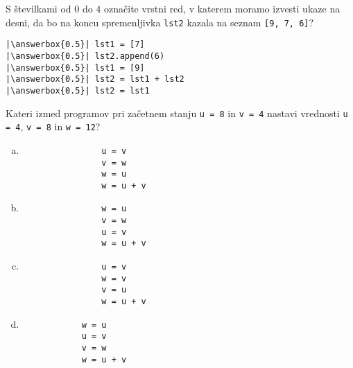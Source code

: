\documentclass[arhiv, 10pt]{../izpit}
\newcommand{\inlinepy}[1]{\texttt{#1}}
\newcommand{\answerbox}[1]{\framebox{\vphantom{\large M}\hspace{#1cm}}}
\begin{document}
        \naloga*
        \begin{multicols}{2}
        \noindent 
        S številkami od $0$ do $4$ označite vrstni red, v katerem moramo izvesti ukaze na desni, da bo na koncu spremenljivka \inlinepy{lst2} kazala na seznam \inlinepy{[9, 7, 6]}?
    
        \columnbreak
        \noindent
        \begin{verbatim}
|\answerbox{0.5}| lst1 = [7]
|\answerbox{0.5}| lst2.append(6)
|\answerbox{0.5}| lst1 = [9]
|\answerbox{0.5}| lst2 = lst1 + lst2
|\answerbox{0.5}| lst2 = lst1

        \end{verbatim}
        \end{multicols}
    
            
        \naloga*
        
        Kateri izmed programov pri začetnem stanju
            \inlinepy{u = 8} in
            \inlinepy{v = 4}
        nastavi vrednosti
            \inlinepy{u = 4},
            \inlinepy{v = 8} in
            \inlinepy{w = 12}?
    
        \begin{multicols}{4}
        \begin{enumerate}[(a)]
\item 
                \begin{verbatim}
                u = v
                v = w
                w = u
                w = u + v
                \end{verbatim}
            
\item 
                \begin{verbatim}
                w = u
                v = w
                u = v
                w = u + v
                \end{verbatim}
            
\item 
                \begin{verbatim}
                u = v
                w = v
                v = u
                w = u + v
                \end{verbatim}
            
\item 
            \begin{verbatim}
            w = u
            u = v
            v = w
            w = u + v
            \end{verbatim}
        
\end{enumerate}

        \end{multicols}
    
\end{document}
